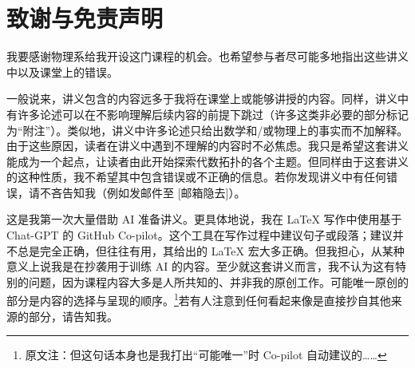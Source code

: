 \chapter*{致谢与免责声明}

我要感谢物理系给我开设这门课程的机会。也希望参与者尽可能多地指出这些讲义中以及课堂上的错误。

一般说来，讲义包含的内容远多于我将在课堂上或能够讲授的内容。同样，讲义中有许多论述可以在不影响理解后续内容的前提下跳过（许多这类非必要的部分标记为“附注”）。类似地，讲义中许多论述只给出数学和/或物理上的事实而不加解释。由于这些原因，读者在讲义中遇到不理解的内容时不必焦虑。我只是希望这套讲义能成为一个起点，让读者由此开始探索代数拓扑的各个主题。但同样由于这套讲义的这种性质，我不希望其中包含错误或不正确的信息。若你发现讲义中有任何错误，请不吝告知我（例如发邮件至 [邮箱隐去]）。

这是我第一次大量借助 AI 准备讲义。更具体地说，我在 \LaTeX{} 写作中使用基于 Chat-GPT 的 GitHub Co-pilot。这个工具在写作过程中建议句子或段落；建议并不总是完全正确，但往往有用，其给出的 \LaTeX{} 宏大多正确。但我担心，从某种意义上说我是在抄袭用于训练 AI 的内容。至少就这套讲义而言，我不认为这有特别的问题，因为课程内容大多是人所共知的、并非我的原创工作。可能唯一原创的部分是内容的选择与呈现的顺序。\footnote{原文注：但这句话本身也是我打出“可能唯一”时 Co-pilot 自动建议的……}若有人注意到任何看起来像是直接抄自其他来源的部分，请告知我。
